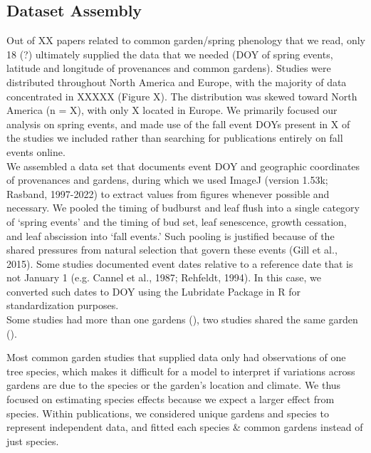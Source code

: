 \documentclass{article}
\begin{document}

\subsection{Dataset Assembly}

Out of XX papers related to common garden/spring phenology that we read, only 18 (?) ultimately supplied the data that we needed (DOY of spring events, latitude and longitude of provenances and common gardens).  Studies were distributed throughout North America and Europe, with the majority of data concentrated in XXXXX (Figure X). The distribution was skewed toward North America (n = X), with only X located in Europe. We primarily focused our analysis on spring events, and made use of the fall event DOYs present in X of the studies we included rather than searching for publications entirely on fall events online. 
\\

We assembled a data set that documents event DOY and geographic coordinates of provenances and gardens, during which we used ImageJ (version 1.53k; Rasband, 1997-2022) to extract values from figures whenever possible and necessary. We pooled the timing of budburst and leaf flush into a single category of ‘spring events’ and the timing of bud set, leaf senescence, growth cessation, and leaf abscission into ‘fall events.’ Such pooling is justified because of the shared pressures from natural selection that govern these events (Gill et al., 2015). Some studies documented event dates relative to a reference date that is not January 1 (e.g. Cannel et al., 1987; Rehfeldt, 1994). In this case, we converted such dates to DOY using the Lubridate Package in R for standardization purposes.
\\


Some studies had more than one gardens (), two studies shared the same garden ().

Most common garden studies that supplied data only had observations of one tree species, which makes it difficult for a model to interpret if variations across gardens are due to the species or the garden’s location and climate. We thus focused on estimating species effects because we expect a larger effect from species. Within publications, we considered unique gardens and species to represent independent data, and fitted each species \& common gardens instead of just species. 
\end{document}
